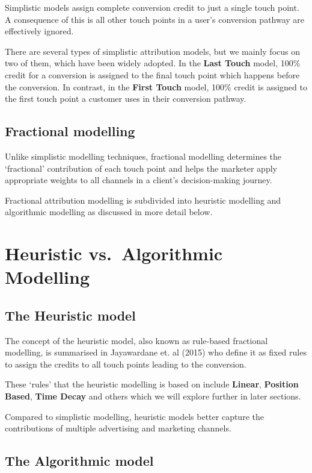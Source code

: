 \documentclass[]{book}
\begin{document}
Simplistic models assign complete conversion credit to just a single
touch point. A consequence of this is all other touch points in a user's
conversion pathway are effectively ignored.

There are several types of simplistic attribution models, but we mainly
focus on two of them, which have been widely adopted. In the
\textbf{Last Touch} model, 100\% credit for a conversion is assigned to
the final touch point which happens before the conversion. In contrast,
in the \textbf{First Touch} model, 100\% credit is assigned to the first
touch point a customer uses in their conversion pathway.

\subsection{Fractional modelling}\label{fractional-modelling}

Unlike simplistic modelling techniques, fractional modelling determines
the `fractional' contribution of each touch point and helps the marketer
apply appropriate weights to all channels in a client's decision-making
journey.

Fractional attribution modelling is subdivided into heuristic modelling
and algorithmic modelling as discussed in more detail below.

\section{Heuristic vs.~Algorithmic
Modelling}\label{heuristic-vs.algorithmic-modelling}

\subsection{The Heuristic model}\label{the-heuristic-model}

The concept of the heuristic model, also known as rule-based fractional
modelling, is summarised in Jayawardane et. al (2015) who define it as
fixed rules to assign the credits to all touch points leading to the
conversion.

These `rules' that the heuristic modelling is based on include
\textbf{Linear}, \textbf{Position Based}, \textbf{Time Decay} and others
which we will explore further in later sections.

Compared to simplistic modelling, heuristic models better capture the
contributions of multiple advertising and marketing channels.

\subsection{The Algorithmic model}\label{the-algorithmic-model}
\end{document}
